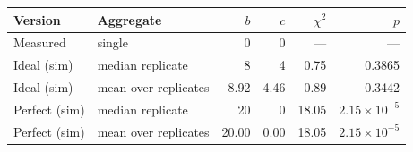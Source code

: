 \begin{tabular}{llrrrr}
\toprule
Version & Aggregate & $b$ & $c$ & $\chi^2$ & $p$ \\
\midrule
Measured & single & 0 & 0 & --- & --- \\
Ideal (sim) & median replicate & 8 & 4 & 0.75 & 0.3865 \\
Ideal (sim) & mean over replicates & 8.92 & 4.46 & 0.89 & 0.3442 \\
Perfect (sim) & median replicate & 20 & 0 & 18.05 & $2.15\times 10^{-5}$ \\
Perfect (sim) & mean over replicates & 20.00 & 0.00 & 18.05 & $2.15\times 10^{-5}$ \\
\bottomrule
\end{tabular}
